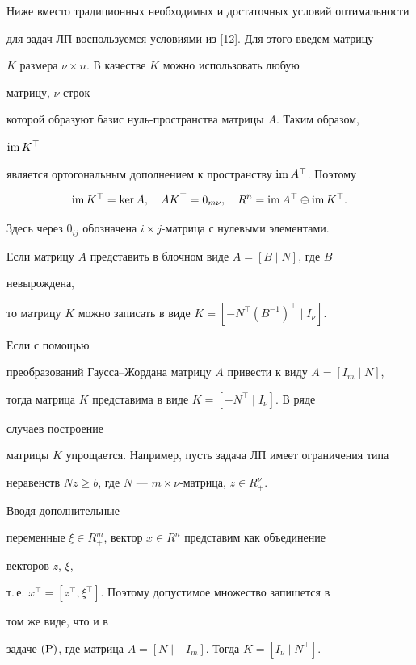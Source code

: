 Ниже вместо традиционных необходимых и достаточных условий оптимальности


для задач ЛП воспользуемся условиями из [12]. Для этого введем матрицу


$K$ размера $\nu\times n$. В качестве $K$ можно использовать любую 


матрицу, $\nu$ строк


которой образуют базис нуль-пространства матрицы $A$. Таким образом, 


$\operatorname{im} K^\top$


является ортогональным дополнением к пространству $\operatorname{im} A^\top$. Поэтому


\begin{equation}


\im K^\top=\ker A,\quad A K^\top=0_{m\nu},\quad


R^n=\im A^\top\oplus \im K^\top.


\end{equation}


Здесь через $0_{ij}$ обозначена $i\times j$-матрица с нулевыми элементами.





Если матрицу $A$ представить в блочном виде $A=[B\mid N]$, где $B$ 


невырождена,


то матрицу $K$ можно записать в виде $K=[-N^\top(B^{-1})^\top\mid I_\nu]$. 


Если с помощью


преобразований Гаусса--Жордана матрицу $A$ привести к виду $A=[I_m\mid 


N]$,


тогда матрица $K$ представима в виде $K=[-N^\top\mid I_\nu]$. В ряде 


случаев построение


матрицы $K$ упрощается. Например, пусть задача ЛП имеет ограничения типа


неравенств $N z\ge b$, где $N$ --- $m\times\nu$-матрица, $z\in R^\nu_+$. 


Вводя дополнительные


переменные $\xi\in R^m_+$, вектор $x\in R^n$ представим как объединение 


векторов $z$, $\xi$,


т.\,е. $x^\top=[z^\top,\xi^\top]$. Поэтому допустимое множество запишется в 


том же виде, что и в


задаче $(\mathrm P)$, где матрица $A=[N\mid-I_m]$. Тогда $K=[I_\nu\mid N^\top]$.





